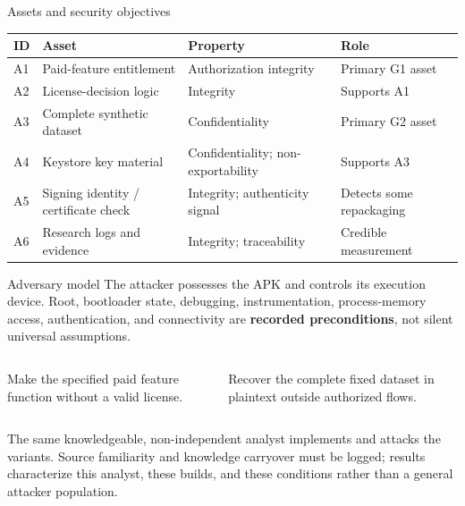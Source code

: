 \documentclass[final]{beamer}
\newlength{\colwidth}
\begin{document}
\begin{frame}[t]
\begin{columns}[t]
\begin{column}{\colwidth}
\begin{block}{Assets and security objectives}
  \small
  \begin{tabularx}{\linewidth}{@{}L{2cm}L{10cm}L{8.4cm}Y@{}}
    \toprule
    \textbf{ID} & \textbf{Asset} & \textbf{Property} & \textbf{Role} \\
    \midrule
    A1 & Paid-feature entitlement & Authorization integrity & Primary G1 asset \\
    A2 & License-decision logic & Integrity & Supports A1 \\
    A3 & Complete synthetic dataset & Confidentiality & Primary G2 asset \\
    A4 & Keystore key material & Confidentiality; non-exportability & Supports A3 \\
    A5 & Signing identity / certificate check & Integrity; authenticity signal & Detects some repackaging \\
    A6 & Research logs and evidence & Integrity; traceability & Credible measurement \\
    \bottomrule
  \end{tabularx}
\end{block}

\begin{block}{Adversary model}
  The attacker possesses the APK and controls its execution device. Root,
  bootloader state, debugging, instrumentation, process-memory access,
  authentication, and connectivity are \textbf{recorded preconditions}, not
  silent universal assumptions.

  \begin{columns}[t,totalwidth=\linewidth]
    \begin{column}{0.48\linewidth}
      Make the specified paid feature function without a valid license.
    \end{column}
    \begin{column}{0.48\linewidth}
      Recover the complete fixed dataset in plaintext outside authorized flows.
    \end{column}
  \end{columns}

  The same knowledgeable, non-independent analyst implements and attacks the
  variants. Source familiarity and knowledge carryover must be logged; results
  characterize this analyst, these builds, and these conditions rather than a
  general attacker population.
\end{block}


\end{column}
\end{columns}
\end{frame}
\end{document}
